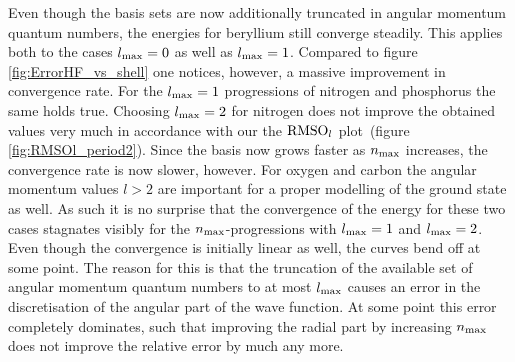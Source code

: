 Even though the basis sets
are now additionally truncated in angular momentum quantum numbers,
the \HF energies for beryllium still converge steadily.
This applies both to the cases $l_\text{max} = 0$ as well as $l_\text{max} = 1$.
Compared to figure \vref{fig:ErrorHF_vs_shell} one notices,
however, a massive improvement in convergence rate.
For the $l_\text{max} = 1$ progressions of nitrogen and phosphorus the same holds true.
Choosing $l_\text{max} = 2$ for nitrogen does not improve the obtained
values very much
in accordance with our the $\text{RMSO}_l$ plot~(figure \ref{fig:RMSOl_period2}).
Since the basis now grows faster as $n_\text{max}$ increases,
the convergence rate is now slower, however.
For oxygen and carbon the angular momentum values $l > 2$ are important
for a proper modelling of the ground state as well.
As such it is no surprise that the convergence of the \HF energy
for these two cases stagnates visibly for the $n_\text{max}$-progressions
with $l_\text{max} = 1$ and $l_\text{max} = 2$.
Even though the convergence is initially linear as well,
the curves bend off at some point.
The reason for this is that the truncation of the available
set of angular momentum quantum numbers to at most $l_\text{max}$ causes
an error in the discretisation of the angular part of the \HF wave function.
At some point this error completely dominates,
such that improving the radial part by increasing $n_\text{max}$
does not improve the relative error by much any more.

